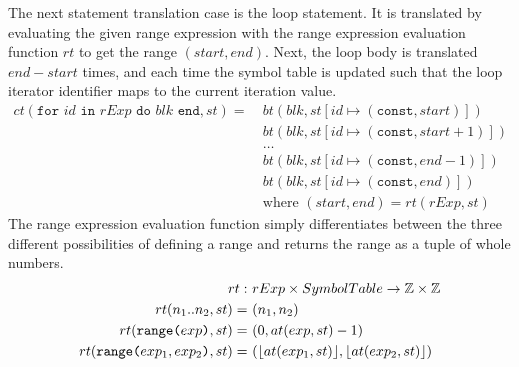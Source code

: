 The next statement translation case is the loop statement. It is translated by evaluating the given range expression with the range expression evaluation function $rt$ to get the range $(start, end)$. Next, the loop body is translated $end - start$ times, and each time the symbol table is updated such that the loop iterator identifier maps to the current iteration value.
\begin{align*}
    ct(\texttt{for } id \texttt{ in } rExp \texttt{ do } blk \texttt{ end}, st) = \ 
        & bt(blk, st[id \mapsto (\texttt{const}, start)])\\
        & bt(blk, st[id \mapsto (\texttt{const}, start + 1)])\\
        & \dots\\
        & bt(blk, st[id \mapsto (\texttt{const}, end - 1)])\\
        & bt(blk, st[id \mapsto (\texttt{const}, end)])\\
        & \text{where } (start, end) = rt(rExp, st)
\end{align*}
The range expression evaluation function simply differentiates between the three different possibilities of defining a range and returns the range as a tuple of whole numbers.
\begin{align*}
    rt : \ & rExp \times SymbolTable \to \mathbb{Z} \times \mathbb{Z}\\
    rt(n_1 .. n_2, st)  = \ & (n_1, n_2)\\
    rt(\texttt{range(} exp \texttt{)}, st) = \ & (0, at(exp, st) - 1)\\
    rt(\texttt{range(} exp_1, exp_2 \texttt{)}, st) = \ & (\lfloor at(exp_1, st)\rfloor, \lfloor at(exp_2, st)\rfloor)
\end{align*}

